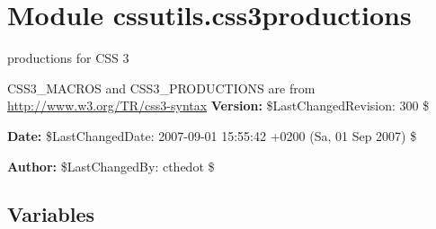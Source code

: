 %
%
%


\section{Module cssutils.css3productions}

    \label{cssutils:css3productions}

productions for CSS 3

CSS3{\_}MACROS and CSS3{\_}PRODUCTIONS are from \href{http://www.w3.org/TR/css3-syntax}{http://www.w3.org/TR/css3-syntax}
\textbf{Version:} \$LastChangedRevision: 300 \$



\textbf{Date:} \$LastChangedDate: 2007-09-01 15:55:42 +0200 (Sa, 01 Sep 2007) \$



\textbf{Author:} \$LastChangedBy: cthedot \$





  \subsection{Variables}

